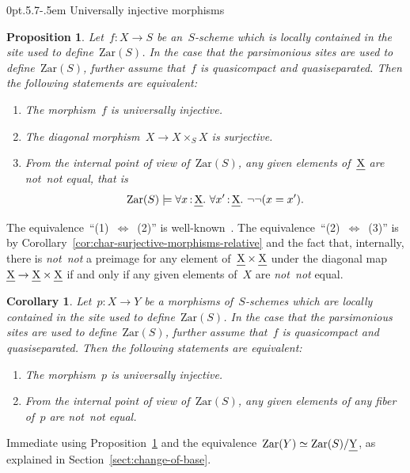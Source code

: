 \documentclass[10pt,reqno,a4paper]{amsbook}
\makeatletter
\theoremstyle{definition}
\theoremstyle{plain}
\newtheorem{prop}[defn]{Proposition}
\newtheorem{cor}[defn]{Corollary}
\theoremstyle{remark}
\let\oldul\ul
\renewcommand{\ul}[1]{\text{\oldul{$#1$}}}
\newcommand{\Zar}{\mathrm{Zar}}
\newcommand{\?}{\,{:}\,}
\renewcommand{\_}{\mathpunct{.}\,}
\newcommand{\notnot}{\emph{not~not}\xspace}
\newcommand{\stacksproject}[1]{\cite[{\href{http://stacks.math.columbia.edu/tag/#1}{Tag~#1}}]{stacks-project}}
\renewenvironment{proof}[1][\proofname]{\par
  \pushQED{\qed}%
  \normalfont \topsep6\p@\@plus6\p@\relax
  \trivlist
  \item[\hskip\labelsep
        \itshape
    #1\@addpunct{.}]\ignorespaces
}{%
  \popQED\endtrivlist\@endpefalse
}
\def\subsection{\@startsection{subsection}{2}%
  {0pt}{.5\linespacing\@plus.7\linespacing}{-.5em}%
  {\normalfont\bfseries}}
\makeatother
\begin{document}
\subsection{Universally injective morphisms}

\begin{prop}\label{prop:char-univ-injective-morphisms}
Let~$f : X \to S$ be an~$S$-scheme which is locally contained in the site
used to define~$\Zar(S)$. In the case that the parsimonious sites are used to
define~$\Zar(S)$, further assume that~$f$ is quasicompact and quasiseparated.
Then the following statements are equivalent:
\begin{enumerate}
\item The morphism~$f$ is universally injective.
\item The diagonal morphism~$X \to X \times_S X$ is surjective.
\item From the internal point of view of~$\Zar(S)$, any given elements of~$\ul{X}$
are \notnot equal, that is
\[ \Zar(S) \models \forall x\?\ul{X}\_ \forall x'\?\ul{X}\_ \neg\neg(x = x'). \]
\end{enumerate}
\end{prop}

\begin{proof}The equivalence~``(1)~$\Leftrightarrow$~(2)'' is
well-known~\stacksproject{01S4}. The equivalence~``(2)~$\Leftrightarrow$~(3)''
is by Corollary~\ref{cor:char-surjective-morphisms-relative} and the fact that,
internally, there is \notnot a preimage for any element of~$\ul{X} \times
\ul{X}$ under the diagonal map~$\ul{X} \to \ul{X} \times \ul{X}$ if and only if
any given elements of~$X$ are \notnot equal.
\end{proof}

\begin{cor}Let~$p : X \to Y$ be a morphisms of~$S$-schemes which are locally
contained in the site used to define~$\Zar(S)$. In the case that the
parsimonious sites are used to define~$\Zar(S)$, further assume that~$f$ is
quasicompact and quasiseparated. Then the following statements
are equivalent:
\begin{enumerate}
\item The morphism~$p$ is universally injective.
\item From the internal point of view of~$\Zar(S)$, any given elements of any
fiber of~$p$ are \notnot equal.
\end{enumerate}
\end{cor}

\begin{proof}Immediate using Proposition~\ref{prop:char-univ-injective-morphisms}
and the equivalence~$\Zar(Y) \simeq \Zar(S)/\ul{Y}$,
as explained in Section~\ref{sect:change-of-base}.
\end{proof}
\end{document}
